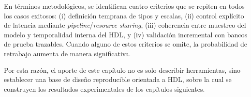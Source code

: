 En términos metodológicos, se identifican cuatro criterios que se repiten en todos los casos exitosos: (i) definición temprana de tipos y escalas, (ii) control explícito de latencia mediante \textit{pipeline}/\textit{resource sharing}, (iii) coherencia entre muestreo del modelo y temporalidad interna del HDL, y (iv) validación incremental con bancos de prueba trazables. Cuando alguno de estos criterios se omite, la probabilidad de retrabajo aumenta de manera significativa.

Por esta razón, el aporte de este capítulo no es solo describir herramientas, sino establecer una base de diseño reproducible orientada a HDL, sobre la cual se construyen los resultados experimentales de los capítulos siguientes.
